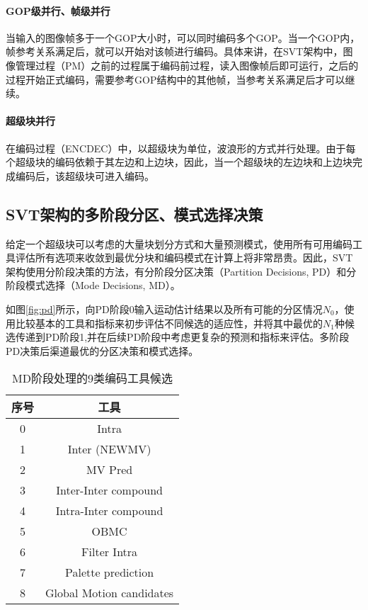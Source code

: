   \paragraph{GOP级并行、帧级并行} 当输入的图像帧多于一个GOP大小时，可以同时编码多个GOP。当一个GOP内，帧参考关系满足后，就可以开始对该帧进行编码。具体来讲，在SVT架构中，图像管理过程（PM）之前的过程属于编码前过程，读入图像帧后即可运行，之后的过程开始正式编码，需要参考GOP结构中的其他帧，当参考关系满足后才可以继续。
  \paragraph{超级块并行} 在编码过程（ENCDEC）中，以超级块为单位，波浪形的方式并行处理。由于每个超级块的编码依赖于其左边和上边块，因此，当一个超级块的左边块和上边块完成编码后，该超级块可进入编码。

  \subsection{SVT架构的多阶段分区、模式选择决策} \label{sec:pd-md}
  给定一个超级块可以考虑的大量块划分方式和大量预测模式，使用所有可用编码工具评估所有选项来收敛到最优分块和编码模式在计算上将非常昂贵。因此，SVT架构使用分阶段决策的方法，有分阶段分区决策（Partition Decisions, PD）和分阶段模式选择（Mode Decisions, MD）。

  如图\ref{fig:pd}所示，向PD阶段0输入运动估计结果以及所有可能的分区情况$N_0$，使用比较基本的工具和指标来初步评估不同候选的适应性，并将其中最优的$N_1$种候选传递到PD阶段1,并在后续PD阶段中考虑更复杂的预测和指标来评估。多阶段PD决策后渠道最优的分区决策和模式选择。

  \begin{table}[!hpt]
    \renewcommand{\arraystretch}{0.8}
    \caption{MD阶段处理的9类编码工具候选}
    \label{tab:av1-classes}
    \centering
    \begin{tabular}{cc} \toprule
      序号    & 工具 \\ \midrule
      0& Intra \\
      1& Inter (NEWMV) \\
      2& MV Pred  \\
      3& Inter-Inter compound \\
      4& Intra-Inter compound \\
      5& OBMC \\
      6& Filter Intra \\
      7& Palette prediction \\
      8& Global Motion candidates \\\bottomrule
    \end{tabular}
  \end{table}

